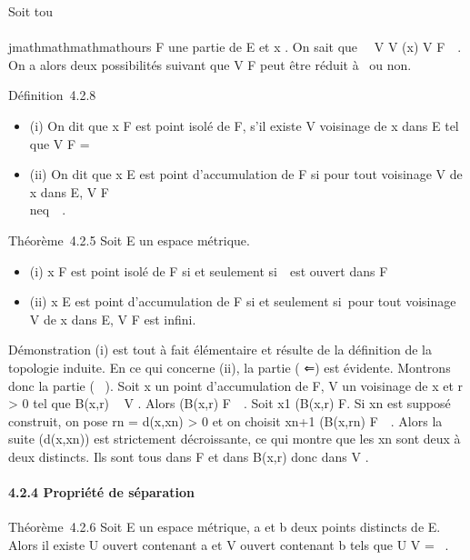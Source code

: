 Soit tou\\\\jmathmathmathmathours F une partie de E et x \in\overlineF. On
sait que \forall~~V \in V (x) V \bigcap
F\neq~\varnothing~. On a alors deux possibilités suivant que
V \bigcap F peut être réduit à \x\ ou non.

Définition~4.2.8

\begin{itemize}
\itemsep1pt\parskip0pt
\item
  (i) On dit que x \in F est point isolé de F, s'il existe V voisinage de
  x dans E tel que V \bigcap F = \x\
\item
  (ii) On dit que x \in E est point d'accumulation de F si pour tout
  voisinage V de x dans E, V \bigcap F
  \diagdown\x\\neq~\varnothing~.
\end{itemize}

Théorème~4.2.5 Soit E un espace métrique.

\begin{itemize}
\itemsep1pt\parskip0pt
\item
  (i) x \in F est point isolé de F si et seulement
  si~\x\ est ouvert dans F
\item
  (ii) x \in E est point d'accumulation de F si et seulement si~pour tout
  voisinage V de x dans E, V \bigcap F est infini.
\end{itemize}

Démonstration (i) est tout à fait élémentaire et résulte de la
définition de la topologie induite. En ce qui concerne (ii), la partie (
⇐) est évidente. Montrons donc la partie ( \rigtharrow~). Soit x un point
d'accumulation de F, V un voisinage de x et r \textgreater{} 0 tel que
B(x,r) \subset~ V . Alors (B(x,r) \diagdown\x\) \bigcap
F\neq~\varnothing~. Soit x1 \in (B(x,r)
\diagdown\x\) \bigcap F. Si xn est supposé
construit, on pose rn = d(x,xn) \textgreater{} 0 et
on choisit xn+1 \in (B(x,rn)
\diagdown\x\) \bigcap
F\neq~\varnothing~. Alors la suite (d(x,xn)) est
strictement décroissante, ce qui montre que les xn sont deux à
deux distincts. Ils sont tous dans F et dans B(x,r) donc dans V .

\paragraph{4.2.4 Propriété de séparation}

Théorème~4.2.6 Soit E un espace métrique, a et b deux points distincts
de E. Alors il existe U ouvert contenant a et V ouvert contenant b tels
que U \bigcap V = \varnothing~.

